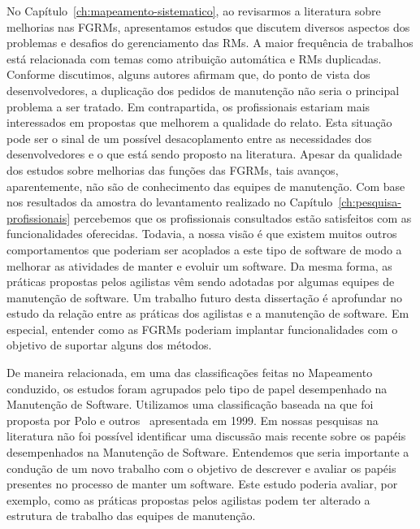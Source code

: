 No Capítulo~\ref{ch:mapeamento-sistematico}, ao revisarmos a literatura sobre
melhorias nas FGRMs, apresentamos estudos que discutem diversos aspectos dos
problemas e desafios do gerenciamento das RMs. A maior frequência de trabalhos
está relacionada com temas como atribuição automática e RMs duplicadas.
Conforme discutimos, alguns autores afirmam que, do ponto de vista dos
desenvolvedores, a duplicação dos pedidos de manutenção não seria o principal
problema a ser tratado. Em contrapartida, os profissionais estariam mais
interessados em propostas que melhorem a qualidade do relato. Esta situação
pode ser o sinal de um possível desacoplamento entre as necessidades dos
desenvolvedores e o que está sendo proposto na literatura. Apesar da qualidade
dos estudos sobre melhorias das funções das FGRMs, tais avanços, aparentemente,
não são de conhecimento das equipes de manutenção. Com base nos resultados da
amostra do levantamento realizado no Capítulo~\ref{ch:pesquisa-profissionais}
percebemos que os profissionais consultados estão satisfeitos com as
funcionalidades oferecidas. Todavia, a nossa visão é que existem muitos outros
comportamentos que poderiam ser acoplados a este tipo de software de modo a
melhorar as atividades de manter e evoluir um software. Da mesma forma, as
práticas propostas pelos agilistas vêm sendo adotadas por algumas equipes de
manutenção de software. Um trabalho futuro desta dissertação é aprofundar no
estudo da relação entre as práticas dos agilistas e a manutenção de software.
Em especial, entender como as FGRMs poderiam implantar funcionalidades com o
objetivo de suportar alguns dos métodos.

De maneira relacionada, em uma das classificações feitas no Mapeamento
conduzido, os estudos foram agrupados pelo tipo de papel desempenhado na
Manutenção de Software. Utilizamos uma classificação baseada na que foi
proposta por Polo e outros~\cite{Polo1999} apresentada em 1999. Em nossas
pesquisas na literatura não foi possível identificar uma discussão mais recente
sobre os papéis desempenhados na Manutenção de Software. Entendemos que seria
importante a condução de um novo trabalho com o objetivo de descrever e avaliar
os papéis presentes no processo de manter um software. Este estudo poderia
avaliar, por exemplo, como as práticas propostas pelos agilistas podem ter
alterado a estrutura de trabalho das equipes de manutenção.

